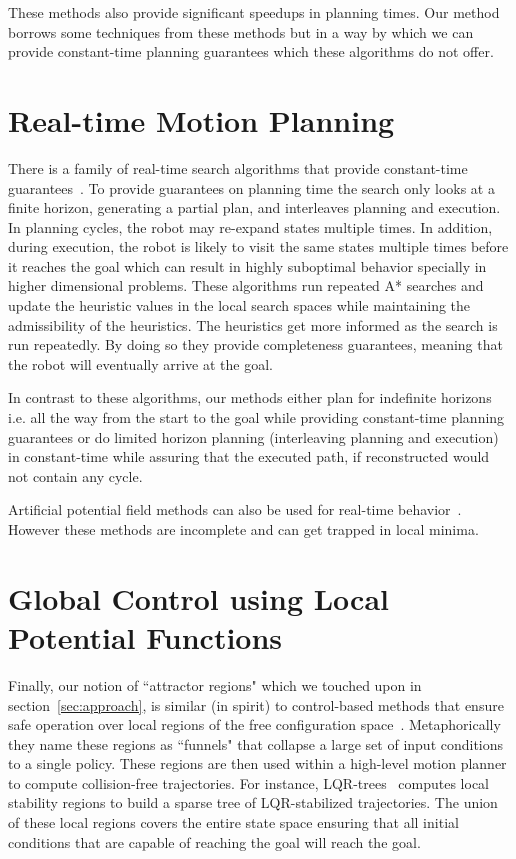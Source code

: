 \documentclass[a4paper]{report}
\begin{document}
These methods also provide significant speedups in planning times. Our method borrows some techniques from these methods but in a way by which we can provide constant-time planning guarantees which these algorithms do not offer.

\section{Real-time Motion Planning}
\label{rel:real}
There is a family of real-time search algorithms that provide constant-time guarantees~\cite{KL06,KS09,K90,bjornsson2009tba}.
	To provide guarantees on planning time the search only looks at a finite horizon, generating a partial plan, and interleaves planning and execution. In planning cycles, the robot may re-expand states multiple times. In addition, during execution, the robot is likely to visit the same states multiple times before it reaches the goal which can result in highly suboptimal behavior specially in higher dimensional problems. These algorithms run repeated A* searches and update the heuristic values in the local search spaces while maintaining the admissibility of the heuristics. The heuristics get more informed as the search is run repeatedly. By doing so they provide completeness guarantees, meaning that the robot will eventually arrive at the goal.

In contrast to these algorithms, our methods either plan for indefinite horizons i.e. all the way from the start to the goal while providing constant-time planning guarantees or do limited horizon planning (interleaving planning and execution) in constant-time while assuring that the executed path, if reconstructed would not contain any cycle.

Artificial potential field methods can also be used for real-time behavior~\cite{warren1989global,vadakkepat2000evolutionary}. However these methods are incomplete and can get trapped in local minima.

\section{Global Control using Local Potential Functions}
Finally, our notion of ``attractor regions" which we touched upon in section~\ref{sec:approach}, is similar (in spirit) to control-based methods that  ensure safe operation over local regions of the free configuration space~\cite{CRC03,CCR06,tedrake2010lqr}. Metaphorically they name these regions as ``funnels" that collapse a large set of input conditions to a single policy.
These regions are then used within a high-level motion planner to compute collision-free trajectories. For instance, LQR-trees~\cite{tedrake2010lqr} computes local stability regions to build a sparse tree of LQR-stabilized trajectories. The union of these local regions covers the entire state space ensuring that all initial conditions that are capable of reaching the goal will reach the goal.
\end{document}
